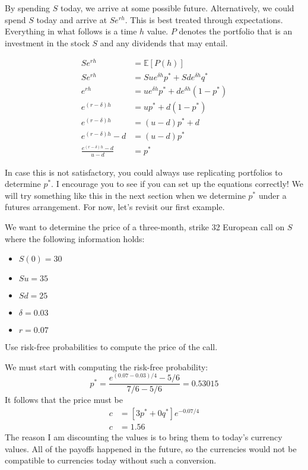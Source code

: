 \documentclass{ximera}
\begin{document}
By spending $S$ today, we arrive at some possible future. Alternatively, we could spend $S$ today and arrive at $Se^{rh}$. This is best treated through expectations. Everything in what follows is a time $h$ value. $P$ denotes the portfolio that is an investment in the stock $S$ and any dividends that may entail. 

\begin{align*}
Se^{rh}&=\mathbb{E}[P(h)]\\
Se^{rh}&=Su e^{\delta h}p^*+Sd e^{\delta h}q^*\\
e^{rh}&=u e^{\delta h}p^*+d e^{\delta h}(1-p^*)\\
e^{(r-\delta)h}&=up^*+d(1-p^*)\\
e^{(r-\delta)h}&=(u-d)p^*+d\\
e^{(r-\delta)h}-d&=(u-d)p^*\\
\frac{e^{(r-\delta)h}-d}{u-d}&=p^*
\end{align*}

In case this is not satisfactory, you could always use replicating portfolios to determine $p^*$. I encourage you to see if you can set up the equations correctly! We will try something like this in the next section when we determine $p^*$ under a futures arrangement. For now, let's revisit our first example.

\begin{example}
We want to determine the price of a three-month, strike 32 European call on $S$ where the following information holds:
	\begin{itemize}
	\item $S(0)=30$
	\item $Su=35$
	\item $Sd=25$
	\item $\delta=0.03$
	\item $r=0.07$
	\end{itemize}
Use risk-free probabilities to compute the price of the call.
\end{example}

\begin{solution}
We must start with computing the risk-free probability:
	\begin{equation*}
	p^*=\frac{e^{(0.07-0.03)/4}-5/6}{7/6-5/6}=0.53015
	\end{equation*}
It follows that the price must be
	\begin{align*}
	c&=[3p^*+0q^*]e^{-0.07/4}\\
	c&=1.56
	\end{align*}
The reason I am discounting the values is to bring them to today's currency values. All of the payoffs happened in the future, so the currencies would not be compatible to currencies today without such a conversion.
\end{solution}
\end{document}
